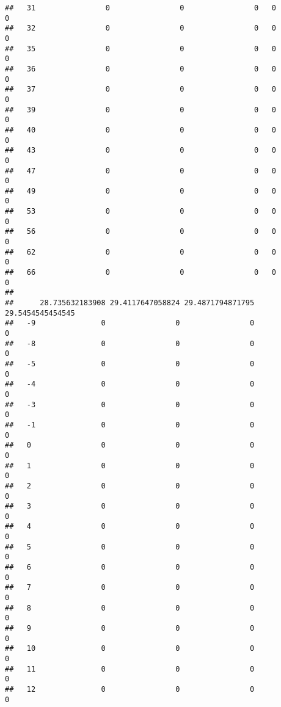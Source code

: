 \documentclass[]{article}
\begin{document}
\begin{verbatim}
##   31                0                0                0   0                0
##   32                0                0                0   0                0
##   35                0                0                0   0                0
##   36                0                0                0   0                0
##   37                0                0                0   0                0
##   39                0                0                0   0                0
##   40                0                0                0   0                0
##   43                0                0                0   0                0
##   47                0                0                0   0                0
##   49                0                0                0   0                0
##   53                0                0                0   0                0
##   56                0                0                0   0                0
##   62                0                0                0   0                0
##   66                0                0                0   0                0
##     
##      28.735632183908 29.4117647058824 29.4871794871795 29.5454545454545
##   -9               0                0                0                0
##   -8               0                0                0                0
##   -5               0                0                0                0
##   -4               0                0                0                0
##   -3               0                0                0                0
##   -1               0                0                0                0
##   0                0                0                0                0
##   1                0                0                0                0
##   2                0                0                0                0
##   3                0                0                0                0
##   4                0                0                0                0
##   5                0                0                0                0
##   6                0                0                0                0
##   7                0                0                0                0
##   8                0                0                0                0
##   9                0                0                0                0
##   10               0                0                0                0
##   11               0                0                0                0
##   12               0                0                0                0

\end{verbatim}
\end{document}
